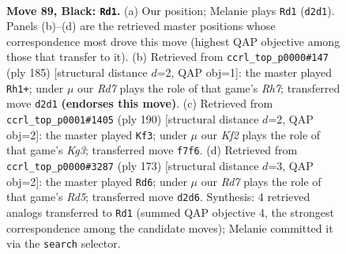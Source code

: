 \documentclass[11pt]{article}
\begin{document}
\clearpage

\begin{figure}[p]\centering
\begin{subfigure}{0.46\textwidth}\centering
\resizebox{\linewidth}{!}{%
\newchessgame
\chessboard[
  setfen={2R5/5k2/8/5p2/8/7K/3r4/8 b - - 7 89},
  showmover=false,
  pgfstyle=straightmove, color=movearrow, markmove={d2-d1}
]}
\caption{}
\end{subfigure}\hfill
\begin{subfigure}{0.46\textwidth}\centering
\resizebox{\linewidth}{!}{%
\newchessgame
\chessboard[
  setfen={1k6/8/8/8/8/2R5/7r/3K4 b - - 17 93},
  showmover=false,
  pgfstyle=straightmove, color=movearrow, markmove={h2-h1}
]}
\caption{}
\end{subfigure}
\\[4pt]
\begin{subfigure}{0.46\textwidth}\centering
\resizebox{\linewidth}{!}{%
\newchessgame
\chessboard[
  setfen={8/R7/5p1k/5P2/1r6/6K1/8/8 w - - 4 96},
  showmover=false,
  pgfstyle=straightmove, color=movearrow, markmove={g3-f3}
]}
\caption{}
\end{subfigure}\hfill
\begin{subfigure}{0.46\textwidth}\centering
\resizebox{\linewidth}{!}{%
\newchessgame
\chessboard[
  setfen={8/8/8/1k6/3r4/4p1K1/4P3/2R5 b - - 17 87},
  showmover=false,
  pgfstyle=straightmove, color=movearrow, markmove={d4-d6}
]}
\caption{}
\end{subfigure}
\caption{\textbf{Move 89, Black: \texttt{Rd1}.} (a) Our position; Melanie plays \texttt{Rd1} (\texttt{d2d1}). Panels (b)--(d) are the retrieved master positions whose correspondence most drove this move (highest QAP objective among those that transfer to it). (b) Retrieved from \texttt{ccrl\_top\_p0000\#147} (ply 185) [structural distance $d$=2, QAP obj=1]: the master played \texttt{Rh1+}; under $\mu$ our \emph{Rd7} plays the role of that game's \emph{Rh7}; transferred move \texttt{d2d1} \textbf{(endorses this move)}. (c) Retrieved from \texttt{ccrl\_top\_p0001\#1405} (ply 190) [structural distance $d$=2, QAP obj=2]: the master played \texttt{Kf3}; under $\mu$ our \emph{Kf2} plays the role of that game's \emph{Kg3}; transferred move \texttt{f7f6}. (d) Retrieved from \texttt{ccrl\_top\_p0000\#3287} (ply 173) [structural distance $d$=3, QAP obj=2]: the master played \texttt{Rd6}; under $\mu$ our \emph{Rd7} plays the role of that game's \emph{Rd5}; transferred move \texttt{d2d6}. Synthesis: 4 retrieved analogs transferred to \texttt{Rd1} (summed QAP objective 4, the strongest correspondence among the candidate moves); Melanie committed it via the \texttt{search} selector.}
\label{fig:thought-m177}
\end{figure}
\end{document}
